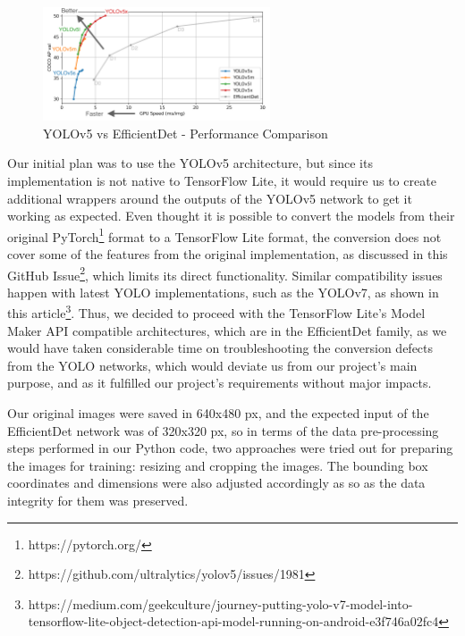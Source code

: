 \documentclass[openright]{normas-utf-tex} %
\begin{document}
\begin{figure}[H]
	\centering
	\includegraphics[width=0.6\textwidth]{./images/yolo-efficientdet-comparison.png}
	\caption[YOLOv5 vs EfficientDet - Performance Comparison]{YOLOv5 vs EfficientDet - Performance Comparison}
    \label{fig:diff}
\end{figure}

Our initial plan was to use the YOLOv5 architecture, but since its implementation is not native
to TensorFlow Lite, it would require us to create additional wrappers around the outputs of the YOLOv5
network to get it working as expected. Even thought it is possible to convert the models from their
original PyTorch\footnote{https://pytorch.org/} format to a TensorFlow Lite format, the conversion does
not cover some of the features from the original implementation, as discussed in this GitHub Issue\footnote{https://github.com/ultralytics/yolov5/issues/1981},
which limits its direct functionality.
Similar compatibility issues happen with latest YOLO implementations, such as the YOLOv7, 
as shown in this article\footnote{https://medium.com/geekculture/journey-putting-yolo-v7-model-into-tensorflow-lite-object-detection-api-model-running-on-android-e3f746a02fc4}. 
Thus, we decided to proceed with the TensorFlow Lite's Model Maker API compatible architectures, 
which are in the EfficientDet family, as we would have taken considerable time on troubleshooting 
the conversion defects from the YOLO networks, which would deviate us from our project's main purpose,
and as it fulfilled our project's requirements without major impacts. 

Our original images were saved in 640x480 px, and the expected input of the EfficientDet network 
was of 320x320 px, so in terms of the data pre-processing steps performed in our Python code, two approaches were
tried out for preparing the images for training: resizing and cropping the images. 
The bounding box coordinates and dimensions were also adjusted accordingly as so as the data 
integrity for them was preserved. 
\end{document}

